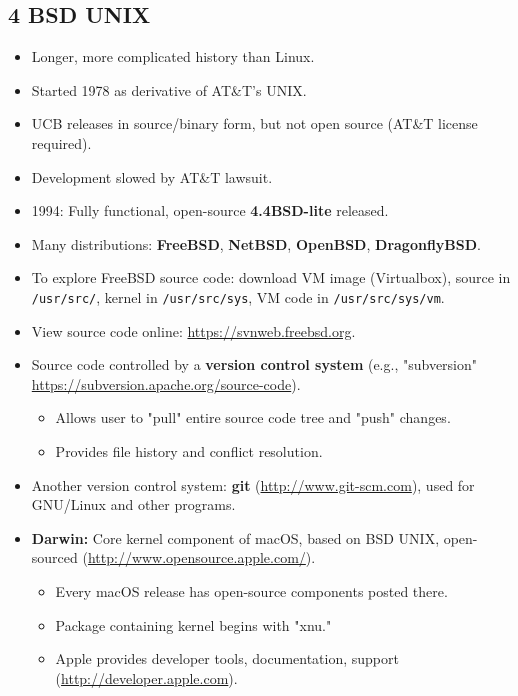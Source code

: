 \documentclass{article}
\begin{document}
\subsection*{4 BSD UNIX}
\begin{itemize}
    \item Longer, more complicated history than Linux.
    \item Started 1978 as derivative of AT\&T's UNIX.
    \item UCB releases in source/binary form, but not open source (AT\&T license required).
    \item Development slowed by AT\&T lawsuit.
    \item 1994: Fully functional, open-source \textbf{4.4BSD-lite} released.
    \item Many distributions: \textbf{FreeBSD}, \textbf{NetBSD}, \textbf{OpenBSD}, \textbf{DragonflyBSD}.
    \item To explore FreeBSD source code: download VM image (Virtualbox), source in \texttt{/usr/src/}, kernel in \texttt{/usr/src/sys}, VM code in \texttt{/usr/src/sys/vm}.
    \item View source code online: \url{https://svnweb.freebsd.org}.
    \item Source code controlled by a \textbf{version control system} (e.g., "subversion" \url{https://subversion.apache.org/source-code}).
    \begin{itemize}
        \item Allows user to "pull" entire source code tree and "push" changes.
        \item Provides file history and conflict resolution.
    \end{itemize}
    \item Another version control system: \textbf{git} (\url{http://www.git-scm.com}), used for GNU/Linux and other programs.
    \item \textbf{Darwin:} Core kernel component of macOS, based on BSD UNIX, open-sourced (\url{http://www.opensource.apple.com/}).
    \begin{itemize}
        \item Every macOS release has open-source components posted there.
        \item Package containing kernel begins with "xnu."
        \item Apple provides developer tools, documentation, support (\url{http://developer.apple.com}).
    \end{itemize}
\end{itemize}
\end{document}
